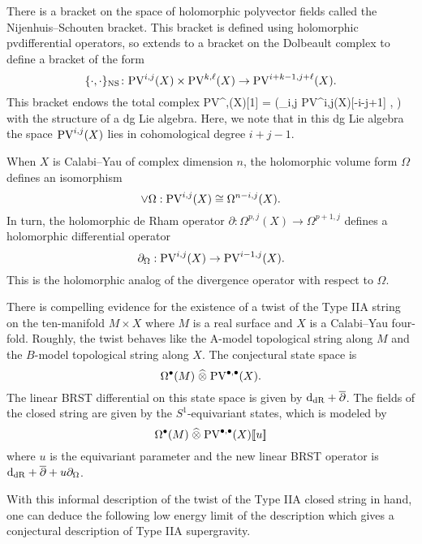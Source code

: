 \documentclass[11pt]{amsart}
\def\pv{{\rm PV}}
\def\PV{{\rm PV}}
\begin{document}
There is a bracket on the space of holomorphic polyvector fields called the Nijenhuis--Schouten bracket.
This bracket is defined using holomorphic pvdifferential operators, so extends to a bracket on the Dolbeault complex to define a bracket of the form
\[
  \{\cdot, \cdot\}_{\rm NS} \colon \pv^{i,j}(X) \times \pv^{k,\ell}(X) \to \PV^{i+k-1, j+\ell}(X) .
\]
This bracket endows the total complex
\beqn\label{eqn:pvlie1}
\pv^{\bu,\bu}(X)[1] = \left(\oplus_{i,j} \pv^{i,j}(X)[-i-j+1] , \dbar \right)
\eeqn
with the structure of a dg Lie algebra.
Here, we note that in this dg Lie algebra the space $\pv^{i,j}(X)$ lies in cohomological degree $i+j-1$.

When $X$ is Calabi--Yau of complex dimension $n$, the holomorphic volume form $\Omega$ defines an isomorphism
\[
  \vee \Omega : \pv^{i,j}(X) \cong \Omega^{n-i, j}(X).
\]
In turn, the holomorphic de Rham operator $\partial : \Omega^{p, j}(X) \to \Omega^{p+1,j}$ defines a holomorphic differential operator
\[
  \partial_{\Omega} : \pv^{i,j}(X) \to \pv^{i-1,j}(X) .
\]
This is the holomorphic analog of the divergence operator with respect to $\Omega$.

There is compelling evidence \cite{CLsugra} for the existence of a twist of the Type IIA string on the ten-manifold $M \times X$ where $M$ is a real surface and $X$ is a Calabi--Yau four-fold.
Roughly, the twist behaves like the A-model topological string along $M$ and the $B$-model topological string along $X$.
The conjectural state space is
\[
  \Omega^\bu(M) \; \Hat{\otimes} \; \PV^{\bu, \bu} (X) .
\]
The linear BRST differential on this state space is given by ${\rm d}_{\rm dR} + \overline{\partial}$.
The fields of the closed string are given by the $S^1$-equivariant states, which is modeled \cite{CLbcov} by
\[
  \Omega^\bu(M) \; \Hat{\otimes} \; \PV^{\bu, \bu} (X) [\![u]\!]
\]
where $u$ is the equivariant parameter and the new linear BRST operator is ${\rm d}_{\rm dR} + \overline{\partial} + u \partial_\Omega$.

With this informal description of the twist of the Type IIA closed string in hand, one can deduce the following low energy limit of the description which gives a conjectural description of Type IIA supergravity.
\end{document}
